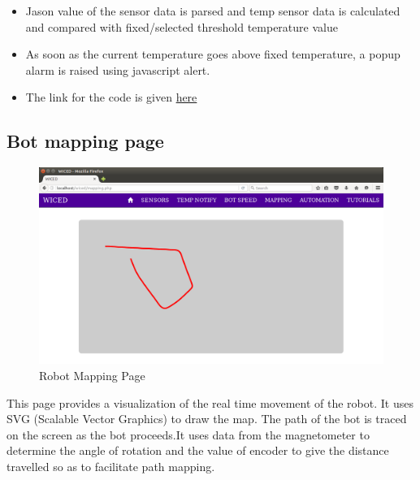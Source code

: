 \documentclass[a4paper,12pt,oneside]{book}
\begin{document}
\begin{itemize}
\begin{itemize}
        \item Jason value of the sensor data is parsed and temp sensor data is calculated and compared with fixed/selected threshold temperature value
        \item As soon as the current temperature goes above fixed temperature, a popup alarm is raised using javascript alert.
        
        \item The link for the code is given \href{https://github.com/eYSIP-2016/Wiced-Sense/blob/master/Codes/wiced%20web/javascript/temp.js}{here}
        \end{itemize}



























\newpage
\subsection{Bot mapping page}

\begin{figure}[h]
        \centering
    	\includegraphics[scale=0.28]{mapping12.png}
    	\caption{Robot Mapping Page}
	    \end{figure}
	    

This page provides a visualization of the real time movement of the robot. It uses SVG (Scalable Vector Graphics) to draw the map. The path of the bot is traced on the screen as the bot proceeds.It uses data from the magnetometer to determine the angle of rotation and the value of encoder to give the distance travelled so as to facilitate path mapping.


\end{itemize}
\end{document}
